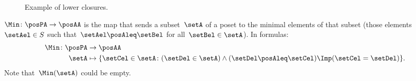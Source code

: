 \begin{figure*}[h!]
	\centering
	\caption{Example of lower closures.}
	\label{fig:examplebatt}
\end{figure*}

\begin{definition}[Min]
	\label{def:Min}
	$\Min \colon \posPA \to \posAA$ is the map that sends a subset~$\setA$ of a poset to the minimal elements of that subset (those elements~$\setAel \in S$ such that~$\setAel \posAleq \setBel$ for all~$\setBel \in \setA$).
	In formulas:
	\begin{equation*}
		\begin{aligned}
			\Min \colon \posPA & \to \posAA                                                                                                   \\
			\setA              & \mapsto \{ \setCel\in \setA\colon (\setDel\in \setA)\wedge(\setDel\posAleq \setCel)\Imp (\setCel=\setDel)\}.
		\end{aligned}
	\end{equation*}
	Note that~$\Min(\setA)$ could be empty.
\end{definition}

